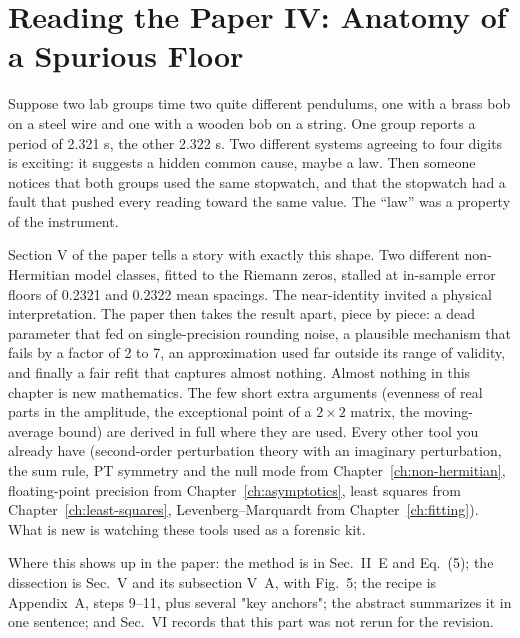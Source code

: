 \chapter{Reading the Paper IV: Anatomy of a Spurious Floor}\label{ch:paper-spurious-floor}

\begin{chapterintro}
Suppose two lab groups time two quite different pendulums, one with a brass bob on a steel wire and one with a wooden bob on a string. One group reports a period of 2.321 s, the other 2.322 s. Two different systems agreeing to four digits is exciting: it suggests a hidden common cause, maybe a law. Then someone notices that both groups used the same stopwatch, and that the stopwatch had a fault that pushed every reading toward the same value. The ``law'' was a property of the instrument.

Section V of the paper \cite{soniR1} tells a story with exactly this shape. Two different non-Hermitian model classes, fitted to the Riemann zeros, stalled at in-sample error floors of 0.2321 and 0.2322 mean spacings. The near-identity invited a physical interpretation. The paper then takes the result apart, piece by piece: a dead parameter that fed on single-precision rounding noise, a plausible mechanism that fails by a factor of 2 to 7, an approximation used far outside its range of validity, and finally a fair refit that captures almost nothing. Almost nothing in this chapter is new mathematics. The few short extra arguments (evenness of real parts in the amplitude, the exceptional point of a $2\times2$ matrix, the moving-average bound) are derived in full where they are used. Every other tool you already have (second-order perturbation theory with an imaginary perturbation, the sum rule, PT symmetry and the null mode from Chapter~\ref{ch:non-hermitian}, floating-point precision from Chapter~\ref{ch:asymptotics}, least squares from Chapter~\ref{ch:least-squares}, Levenberg--Marquardt from Chapter~\ref{ch:fitting}). What is new is watching these tools used as a forensic kit.

Where this shows up in the paper: the method is in Sec.~II~E and Eq.~(5); the dissection is Sec.~V and its subsection V~A, with Fig.~5; the recipe is Appendix~A, steps 9--11, plus several "key anchors"; the abstract summarizes it in one sentence; and Sec.~VI records that this part was not rerun for the revision.
\end{chapterintro}

